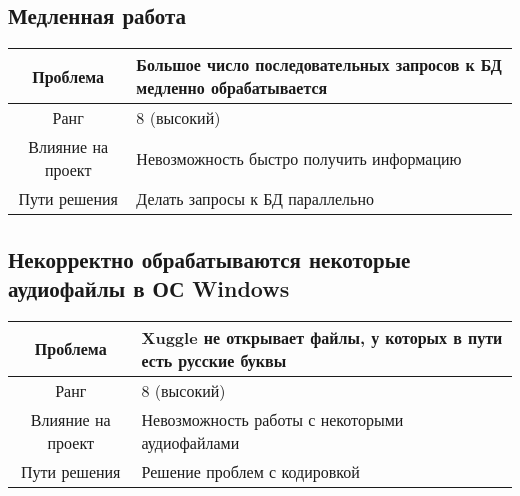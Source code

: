 \documentclass[pdftex,12pt,a4paper]{report}
\begin{document}
\subsection{Медленная работа}
\begin{table}[h]
\begin{tabular}{|c|p{10cm}|} \hline
\cellcolor[gray]{0.9} Проблема  & Большое число последовательных запросов к БД медленно обрабатывается \\ \hline
\cellcolor[gray]{0.9} Ранг  & 8 (высокий) \\ \hline
\cellcolor[gray]{0.9} Влияние на проект & Невозможность быстро получить информацию \\ \hline
\cellcolor[gray]{0.9} Пути решения  & Делать запросы к БД параллельно \\ \hline
\end{tabular}
\end{table}

\newpage
\subsection{Некорректно обрабатываются некоторые аудиофайлы в ОС Windows}
\begin{table}[h]
\begin{tabular}{|c|p{10cm}|} \hline
\cellcolor[gray]{0.9} Проблема  & Xuggle не открывает файлы, у которых в пути есть русские буквы \\ \hline
\cellcolor[gray]{0.9} Ранг  & 8 (высокий) \\ \hline
\cellcolor[gray]{0.9} Влияние на проект & Невозможность работы с некоторыми аудиофайлами \\ \hline
\cellcolor[gray]{0.9} Пути решения  & Решение проблем с кодировкой \\ \hline
\end{tabular}
\end{table}
\end{document}
